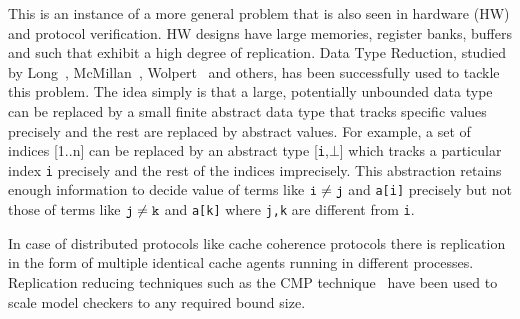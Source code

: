 
This is an instance of a more general problem that is also seen in
hardware (HW) and protocol verification. HW designs have large
memories, register banks, buffers and such that exhibit a high degree
of replication. Data Type Reduction, studied by Long~\cite{long},
McMillan~\cite{mcmillan}, Wolpert~\cite{wolpert} and others, has been
successfully used to tackle this problem. The idea simply is that a
large, potentially unbounded data type can be replaced by a small
finite abstract data type that tracks specific values precisely and
the rest are replaced by abstract values. For example, a set of
indices [1..n] can be replaced by an abstract type [{\tt i},\(\bot\)]
which tracks a particular index {\tt i} precisely and the rest of the
indices imprecisely. This abstraction retains enough information to
decide value of terms like \({\tt i} \neq {\tt j}\) and {\tt a[i]}
precisely but not those of terms like \({\tt j} \neq {\tt k}\) and
{\tt a[k]} where {\tt j,k} are different from {\tt i}.

In case of distributed protocols like cache coherence protocols there
is replication in the form of multiple identical cache agents running
in different processes.  Replication reducing techniques such as the CMP
technique~\cite{self} have been used to scale model checkers to any
required bound size.



